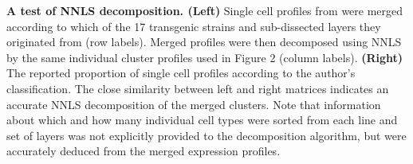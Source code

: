 \textbf{A test of NNLS decomposition. (Left)} Single cell profiles from \cite{Tasic_2016} were merged according to which of the 17 transgenic strains and sub-dissected layers they originated from (row labels). Merged profiles were then decomposed using NNLS by the same individual cluster profiles used in Figure 2 (column labels). \textbf{(Right)} The reported proportion of single cell profiles according to the author's classification. The close similarity between left and right matrices indicates an accurate NNLS decomposition of the merged clusters. Note that information about which and how many individual cell types were sorted from each line and set of layers was not explicitly provided to the decomposition algorithm, but were accurately deduced from the merged expression profiles.